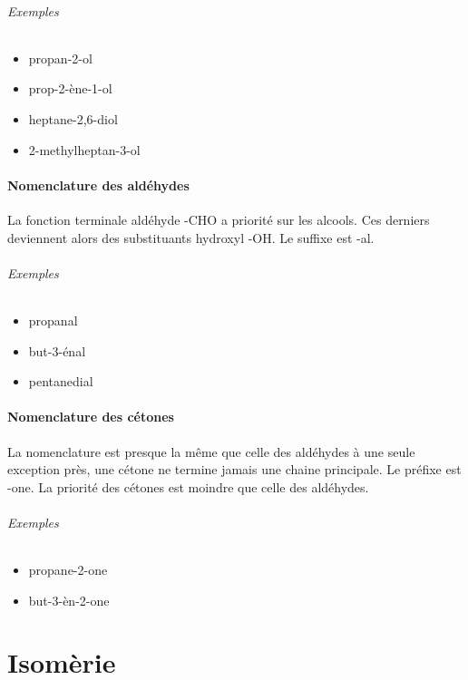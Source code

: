 \paragraph{Exemples}
\begin{itemize}
  \item  propan-2-ol
  \item  prop-2-ène-1-ol
  \item  heptane-2,6-diol
  \item  2-methylheptan-3-ol
\end{itemize}


\subsection{Nomenclature des aldéhydes} La fonction terminale aldéhyde -CHO a priorité sur les alcools.
Ces derniers deviennent alors des substituants hydroxyl -OH.
Le suffixe est -al.

\paragraph{Exemples}
\begin{itemize}
  \item propanal
  \item but-3-énal
  \item pentanedial
\end{itemize}

\subsection{Nomenclature des cétones} La nomenclature est presque la même que celle des aldéhydes à une seule exception près, une cétone ne termine jamais une chaine principale.
Le préfixe est -one.
La priorité des cétones est moindre que celle des aldéhydes.

\paragraph{Exemples}
\begin{itemize}
  \item propane-2-one
  \item but-3-èn-2-one
\end{itemize}

\part{Isomèrie}

